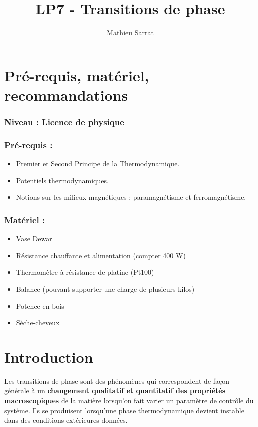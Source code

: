 \documentclass[11pt,a4paper]{report}
\author{Mathieu Sarrat}
\title{LP7 - Transitions de phase}
\begin{document}
\maketitle

\section*{Pré-requis, matériel, recommandations}

\subsubsection*{Niveau : Licence de physique}

\subsubsection*{Pré-requis :}
\begin{itemize}
	\item Premier et Second Principe de la Thermodynamique.
	\item Potentiels thermodynamiques.
	\item Notions sur les milieux magnétiques : paramagnétisme et ferromagnétisme.
\end{itemize}

\subsubsection*{Matériel :}
\begin{itemize}
	\item Vase Dewar
	\item Résistance chauffante et alimentation (compter 400 W)
	\item Thermomètre à résistance de platine (Pt100)
	\item Balance (pouvant supporter une charge de plusieurs kilos)
	\item Potence en bois
	\item Sèche-cheveux
\end{itemize}

\section*{Introduction}

Les transitions de phase sont des phénomènes qui correspondent de façon générale à un \textbf{changement qualitatif et quantitatif des propriétés macroscopiques} de la matière lorsqu'on fait varier un paramètre de contrôle du système. Ils se produisent lorsqu'une phase thermodynamique devient instable dans des conditions extérieures données.
\end{document}
